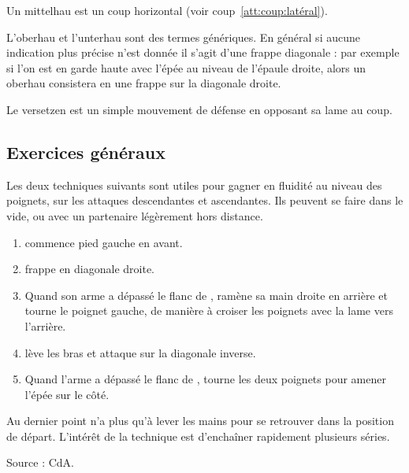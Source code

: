 \begin{coup}
\label{épée-longue:coup:mittelhau}

Un mittelhau est un coup horizontal (voir coup~\ref{att:coup:latéral}).

\end{coup}


L'oberhau et l'unterhau sont des termes génériques.
En général si aucune indication plus précise n'est donnée il s'agit d'une frappe diagonale : par exemple si l'on est en garde haute avec l'épée au niveau de l'épaule droite, alors un oberhau consistera en une frappe sur la diagonale droite.


\begin{garde}[Versetzen]

Le versetzen est un simple mouvement de défense en opposant sa lame au coup.

\end{garde}


\subsection{Exercices généraux}


Les deux techniques suivants sont utiles pour gagner en fluidité au niveau des poignets, sur les attaques descendantes et ascendantes. Ils peuvent se faire dans le vide, ou avec un partenaire légèrement hors distance.

\begin{exercice}

\begin{enumerate}
	\item \A commence pied gauche en avant.
	\item \A frappe en diagonale droite.
	\item Quand son arme a dépassé le flanc de \D, \A ramène sa main droite en arrière et tourne le poignet gauche, de manière à croiser les poignets avec la lame vers l'arrière.
	\item \A lève les bras et attaque sur la diagonale inverse.
	\item Quand l'arme a dépassé le flanc de \D, \A tourne les deux poignets pour amener l'épée sur le côté.
\end{enumerate}

Au dernier point \A n'a plus qu'à lever les mains pour se retrouver dans la position de départ. L'intérêt de la technique est d'enchaîner rapidement plusieurs séries.

Source : CdA.
\end{exercice}


